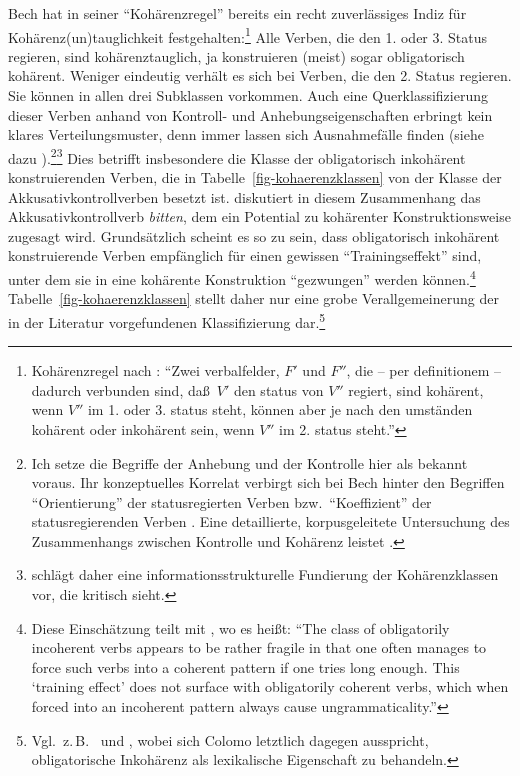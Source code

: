 Bech hat in seiner "`Kohärenzregel"' bereits ein recht zuverlässiges Indiz für Kohärenz\-(un)\-taug\-lich\-keit festgehalten:\footnote{Kohärenzregel nach \cite[\S 65]{Bech:55}: "`Zwei verbalfelder, $F'$ und $F''$, die -- per definitionem -- dadurch verbunden sind, da\ss\ $V'$ den status von $V''$ regiert, sind kohärent, wenn $V''$ im 1. oder 3. status steht, können aber je nach den umständen kohärent oder inkohärent sein, wenn $V''$ im 2. status steht."'} Alle Verben, die den 1. oder 3. Status regieren, sind kohärenztauglich, ja konstruieren (meist) sogar obligatorisch kohärent. Weniger eindeutig verhält es sich bei Verben, die den 2. Status regieren. Sie können in allen drei Subklassen vorkommen. Auch eine Querklassifizierung dieser Verben anhand von Kontroll- und Anhebungseigenschaften erbringt kein klares Verteilungsmuster, denn immer lassen sich Ausnahmefälle finden (siehe dazu \citealt[Abschnitt~2.3]{Meurers:99}).\footnote{Ich setze die Begriffe der Anhebung und der Kontrolle hier als bekannt voraus. Ihr konzeptuelles Korrelat verbirgt sich bei Bech hinter den Begriffen "`Orientierung"' der statusregierten Verben bzw.\ "`Koeffizient"' der statusregierenden Verben \citep[Kapitel~3]{Bech:55}. Eine detaillierte, korpusgeleitete Untersuchung des Zusammenhangs zwischen Kontrolle und Kohärenz leistet \cite{Grosse:05}. }\footnote{\cite{Cook:01} schlägt daher eine informationsstrukturelle Fundierung der Kohärenzklassen vor, die \citet[Abschnitt~4.4]{Grosse:05} kritisch sieht.} Dies betrifft insbesondere die Klasse der obligatorisch inkohärent konstruierenden Verben, die in Tabelle~\ref{fig-kohaerenzklassen} von der Klasse der Akkusativkontrollverben besetzt ist. \cite{Grosse:05} diskutiert in diesem Zusammenhang das Akkusativkontrollverb {\it bitten}, dem ein Potential zu kohärenter Konstruktionsweise zugesagt wird. Grundsätzlich scheint es so zu sein, dass obligatorisch inkohärent konstruierende Verben empfänglich für einen gewissen "`Trainingseffekt"' sind, unter dem sie in eine kohärente Konstruktion "`gezwungen"' werden können.\footnote{Diese Einschätzung teilt \cite{Grosse:05} mit \citet[19, Fußnote 12]{Meurers:99}, wo es hei\ss t: "`The class of obligatorily incoherent verbs appears to be rather fragile in that one often manages to force such verbs into a coherent pattern if one tries long enough. This `training effect' does not surface with obligatorily coherent verbs, which when forced into an incoherent pattern always cause ungrammaticality."'} Tabelle~\ref{fig-kohaerenzklassen} stellt daher nur eine grobe Verallgemeinerung der in der Literatur vorgefundenen Klassifizierung dar.\footnote{Vgl.\ z.\,B.\ \citet[Kapitel~1]{Grosse:05} und \citet[Abschnitt~3.5.2, Tabelle~5, 207]{Colomo:11}, wobei sich Colomo letztlich dagegen ausspricht, obligatorische Inkohärenz als lexikalische Eigenschaft zu behandeln.}

